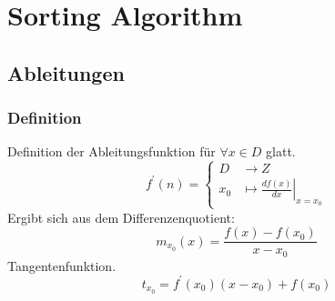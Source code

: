 \documentclass[../Main.tex]{subfiles}
\begin{document}
\chapter{Sorting Algorithm}

\intro{

}

\section{Ableitungen}
\subsection{Definition}
Definition der Ableitungsfunktion für \(\forall x \in D\) glatt.
\begin{equation}
    f^{'}(n) =
  \begin{cases}
    D       &\rightarrow Z\\
    x_0       &\mapsto \left.\frac{d f(x)}{dx}\right|_{x=x_0}
  \end{cases}
\end{equation}
Ergibt sich aus dem Differenzenquotient:
\begin{equation}
    m_{x_0}(x) = \frac{f(x)-f(x_0)}{x-x_0} 
\end{equation}
Tangentenfunktion.
\begin{equation}
    t_{x_0} = f^{'}(x_0)(x-x_0)+f(x_0)
\end{equation}
\end{document}
